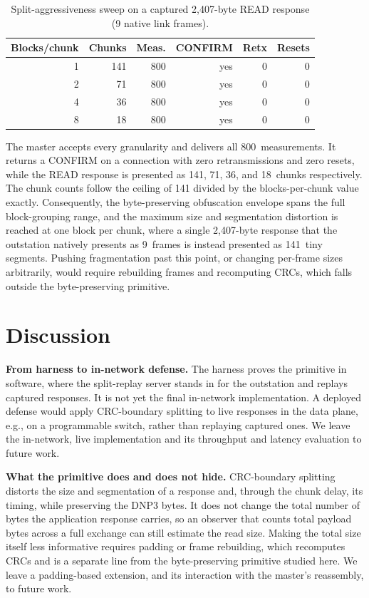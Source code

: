 \documentclass[conference]{IEEEtran}
\begin{document}
\begin{table}[t]
\centering
\caption{Split-aggressiveness sweep on a captured 2{,}407-byte READ response
(9 native link frames).}
\label{tab:sweep}
\begin{tabular}{@{}rrrrrr@{}}
\toprule
Blocks/chunk & Chunks & Meas. & CONFIRM & Retx & Resets \\
\midrule
1 & 141 & 800 & yes & 0 & 0 \\
2 & 71  & 800 & yes & 0 & 0 \\
4 & 36  & 800 & yes & 0 & 0 \\
8 & 18  & 800 & yes & 0 & 0 \\
\bottomrule
\end{tabular}
\end{table}

The master accepts every granularity and delivers all 800~measurements. It
returns a CONFIRM on a connection with zero retransmissions and zero resets, while
the READ response is presented as 141, 71, 36, and 18~chunks respectively. The
chunk counts follow the ceiling of 141 divided by the blocks-per-chunk value
exactly. Consequently, the byte-preserving obfuscation envelope spans the full
block-grouping range, and the maximum size and segmentation distortion is reached
at one block per chunk, where a single 2{,}407-byte response that the outstation
natively presents as 9~frames is instead presented as 141~tiny segments. Pushing
fragmentation past this point, or changing per-frame sizes arbitrarily, would
require rebuilding frames and recomputing CRCs, which falls outside the
byte-preserving primitive.

\section{Discussion}

\noindent\textbf{From harness to in-network defense.} The harness proves the
primitive in software, where the split-replay server stands in for the outstation
and replays captured responses. It is not yet the final in-network
implementation. A deployed defense would apply CRC-boundary splitting to live
responses in the data plane, e.g., on a programmable switch, rather than
replaying captured ones. We leave the in-network, live implementation and its
throughput and latency evaluation to future work.

\noindent\textbf{What the primitive does and does not hide.} CRC-boundary
splitting distorts the size and segmentation of a response and, through the chunk
delay, its timing, while preserving the DNP3 bytes. It does not change the total
number of bytes the application response carries, so an observer that counts
total payload bytes across a full exchange can still estimate the read size.
Making the total size itself less informative requires padding or frame
rebuilding, which recomputes CRCs and is a separate line from the byte-preserving
primitive studied here. We leave a padding-based extension, and its interaction
with the master's reassembly, to future work.
\end{document}
